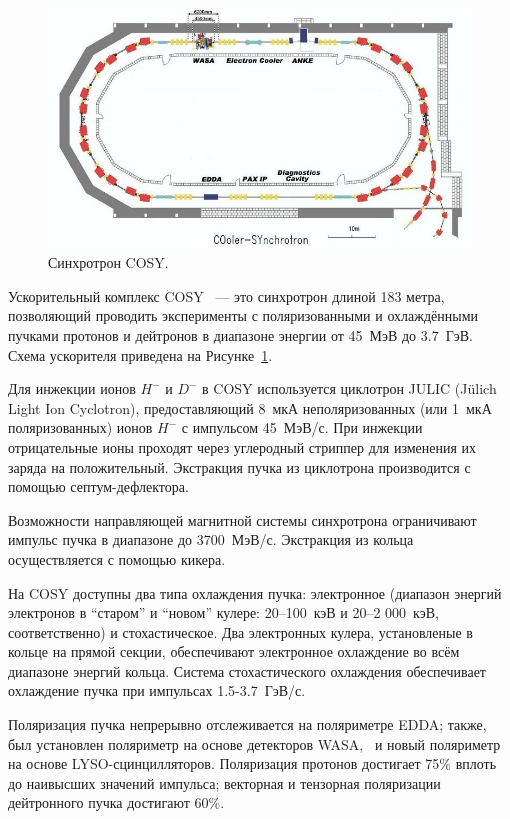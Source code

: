 
\begin{figure}[h]
	\centering
	\includegraphics[scale=.5]{images/chapter4/800px-COSY_Ring}
	\caption{Синхротрон COSY.\label{fig:COSY_Ring}}
\end{figure}

Ускорительный комплекс COSY~\cite{COSY-Ring} --- это синхротрон длиной 183 метра, 
позволяющий проводить эксперименты с поляризованными и охлаждёнными пучками протонов и дейтронов 
в диапазоне энергии от 45~МэВ до 3.7~ГэВ. Схема ускорителя приведена на Рисунке~\ref{fig:COSY_Ring}.

Для инжекции ионов $H^-$ и $D^-$ в COSY  используется циклотрон JULIC (J\"ulich Light Ion Cyclotron),
предоставляющий 8~мкА неполяризованных (или 1~мкА поляризованных) ионов $H^-$ с импульсом 45~МэВ/с. 
При инжекции отрицательные ионы проходят через углеродный стриппер 
для изменения их заряда на положительный. Экстракция пучка из циклотрона 
производится с помощью септум-дефлектора.~\cite{JULIC-Injector}

Возможности направляющей магнитной системы синхротрона ограничивают импульс пучка в диапазоне 
до 3700~МэВ/с. Экстракция из кольца осуществляется с помощью кикера.

На COSY доступны два типа охлаждения пучка: электронное (диапазон энергий электронов в ``старом'' 
и ``новом'' кулере: 20--100~кэВ и 20--2 000~кэВ, соответственно) и стохастическое. 
%
Два электронных кулера, установленые в кольце на прямой секции, обеспечивают 
электронное охлаждение во всём диапазоне энергий кольца. Система стохастического охлаждения 
обеспечивает охлаждение пучка при импульсах 1.5-3.7~ГэВ/с.

Поляризация пучка непрерывно отслеживается на поляриметре  EDDA; 
также, был установлен поляриметр на основе детекторов WASA,~\cite{COSY:WASA} и новый поляриметр 
на основе LYSO-сцинцилляторов.
Поляризация протонов достигает 75\% вплоть до наивысших значений импульса; 
векторная и тензорная поляризации дейтронного пучка достигают 60\%.~\cite[стр.~32]{YellowReport}